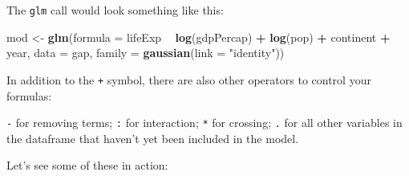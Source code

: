 \documentclass[
]{book}
\newenvironment{Shaded}{\begin{snugshade}}{\end{snugshade}}
\newcommand{\DataTypeTok}[1]{\textcolor[rgb]{0.13,0.29,0.53}{#1}}
\newcommand{\KeywordTok}[1]{\textcolor[rgb]{0.13,0.29,0.53}{\textbf{#1}}}
\newcommand{\NormalTok}[1]{#1}
\newcommand{\OperatorTok}[1]{\textcolor[rgb]{0.81,0.36,0.00}{\textbf{#1}}}
\newcommand{\StringTok}[1]{\textcolor[rgb]{0.31,0.60,0.02}{#1}}
\begin{document}
The \texttt{glm} call would look something like this:

\begin{Shaded}
\begin{Highlighting}[]
\NormalTok{mod <-}\StringTok{ }\KeywordTok{glm}\NormalTok{(}\DataTypeTok{formula =}\NormalTok{ lifeExp }\OperatorTok{~}\StringTok{ }\KeywordTok{log}\NormalTok{(gdpPercap) }\OperatorTok{+}\StringTok{ }\KeywordTok{log}\NormalTok{(pop) }\OperatorTok{+}\StringTok{ }\NormalTok{continent }\OperatorTok{+}\StringTok{ }\NormalTok{year,}
           \DataTypeTok{data =}\NormalTok{ gap, }
           \DataTypeTok{family =} \KeywordTok{gaussian}\NormalTok{(}\DataTypeTok{link =} \StringTok{"identity"}\NormalTok{))}
\end{Highlighting}
\end{Shaded}

In addition to the \texttt{+} symbol, there are also other operators to control your formulas:

\texttt{-} for removing terms;
\texttt{:} for interaction;
\texttt{*} for crossing;
\texttt{.} for all other variables in the dataframe that haven't yet been included in the model.

Let's see some of these in action:
\end{document}
